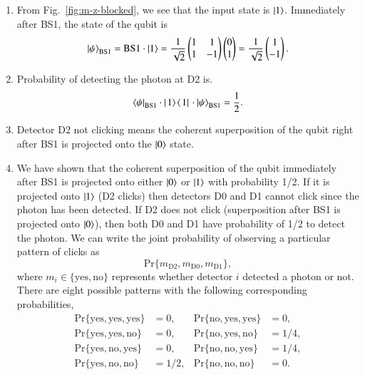 \begin{solution}
\begin{enumerate}[label=(\alph*)]
    \item From Fig.~\ref{fig:m-z-blocked}, we see that the input state is $\left| 1 \right\rangle$. Immediately after BS1, the state of the qubit is
    \begin{equation*}
        \left| \psi \right\rangle_{\text{BS}1}=\text{BS}1\cdot\left| 1 \right\rangle = \frac{1}{\sqrt{2}}\begin{pmatrix}
            1 & 1 \\ 1 & -1
        \end{pmatrix}
        \begin{pmatrix}
            0 \\ 1
        \end{pmatrix} = \frac{1}{\sqrt{2}}
        \begin{pmatrix}
            1 \\ -1
        \end{pmatrix}.
    \end{equation*}
    \item Probability of detecting the photon at D2 is.
    \begin{equation*}
        \left\langle \psi \right|_{\text{BS}1} \cdot \left|\left. 1 \rangle\right.\!\langle\left. 1 \right|\right.  \cdot \left| \psi \right\rangle_{\text{BS}1} = \frac{1}{2}.
    \end{equation*}
    \item Detector D2 not clicking means the coherent superposition of the qubit right after BS1 is projected onto the $\left| 0 \right\rangle$ state.
    \item We have shown that the coherent superposition of the qubit immediately after BS1 is projected onto either $\left| 0 \right\rangle$ or $\left| 1 \right\rangle$ with probability 1/2. If it is projected onto $\left| 1 \right\rangle$ (D2 clicks) then detectors D0 and D1 cannot click since the photon has been detected. If D2 does not click (superposition after BS1 is projected onto $\left| 0 \right\rangle$), then both D0 and D1 have probability of 1/2 to detect the photon. We can write the joint probability of observing a particular pattern of clicks as
    \begin{equation*}
        \text{Pr}\{m_{\text{D}2}, m_{\text{D}0}, m_{\text{D}1}\},
    \end{equation*}
    where $m_i\in\{\text{yes}, \text{no}\}$ represents whether detector $i$ detected a photon or not.
    There are eight possible patterns with the following corresponding probabilities,
    \begin{align*}
        \text{Pr}\{\text{yes},\text{yes},\text{yes}\} & = 0, & \text{Pr}\{\text{no},\text{yes},\text{yes}\} & = 0, \\
        \text{Pr}\{\text{yes},\text{yes},\text{no}\} & = 0, & \text{Pr}\{\text{no},\text{yes},\text{no}\} & = 1/4, \\
        \text{Pr}\{\text{yes},\text{no},\text{yes}\} & = 0, & \text{Pr}\{\text{no},\text{no},\text{yes}\} & = 1/4, \\
        \text{Pr}\{\text{yes},\text{no},\text{no}\} & = 1/2, & \text{Pr}\{\text{no},\text{no},\text{no}\} & = 0.
    \end{align*}
\end{enumerate}
\end{solution}